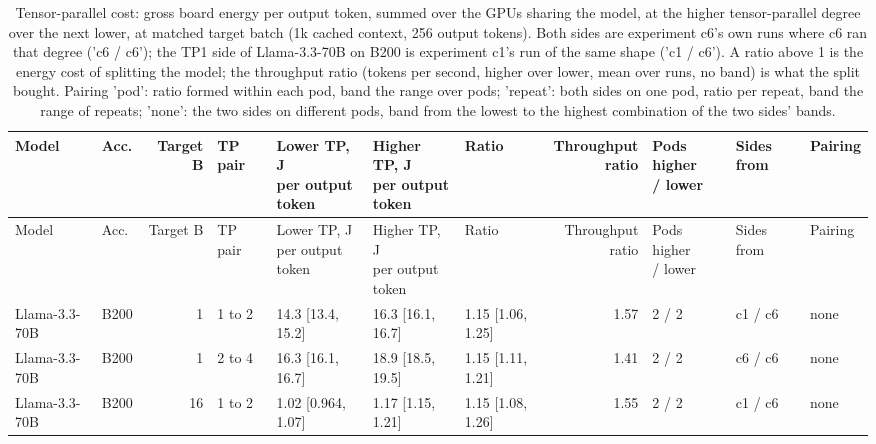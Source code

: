 \begin{landscape}
\begingroup
\scriptsize
\setlength{\tabcolsep}{3pt}
\begin{longtable}{llrllllrlll}
\caption{Tensor-parallel cost: gross board energy per output token, summed over the GPUs sharing the model, at the higher tensor-parallel degree over the next lower, at matched target batch (1k cached context, 256 output tokens). Both sides are experiment c6's own runs where c6 ran that degree ('c6 / c6'); the TP1 side of Llama-3.3-70B on B200 is experiment c1's run of the same shape ('c1 / c6'). A ratio above 1 is the energy cost of splitting the model; the throughput ratio (tokens per second, higher over lower, mean over runs, no band) is what the split bought. Pairing 'pod': ratio formed within each pod, band the range over pods; 'repeat': both sides on one pod, ratio per repeat, band the range of repeats; 'none': the two sides on different pods, band from the lowest to the highest combination of the two sides' bands.}\label{tab:tp}\\
\toprule
Model & Acc. & Target B & TP pair & \makecell[l]{Lower TP, J\\per output\\token} & \makecell[l]{Higher TP, J\\per output\\token} & Ratio & \makecell[r]{Throughput\\ratio} & \makecell[l]{Pods higher\\/ lower} & Sides from & Pairing \\
\midrule
\endfirsthead
\toprule
Model & Acc. & Target B & TP pair & \makecell[l]{Lower TP, J\\per output\\token} & \makecell[l]{Higher TP, J\\per output\\token} & Ratio & \makecell[r]{Throughput\\ratio} & \makecell[l]{Pods higher\\/ lower} & Sides from & Pairing \\
\midrule
\endhead
\bottomrule
\endfoot
Llama-3.3-70B & B200 & 1 & 1 to 2 & 14.3 {[}13.4, 15.2{]} & 16.3 {[}16.1, 16.7{]} & 1.15 {[}1.06, 1.25{]} & 1.57 & 2 / 2 & c1 / c6 & none \\
Llama-3.3-70B & B200 & 1 & 2 to 4 & 16.3 {[}16.1, 16.7{]} & 18.9 {[}18.5, 19.5{]} & 1.15 {[}1.11, 1.21{]} & 1.41 & 2 / 2 & c6 / c6 & none \\
Llama-3.3-70B & B200 & 16 & 1 to 2 & 1.02 {[}0.964, 1.07{]} & 1.17 {[}1.15, 1.21{]} & 1.15 {[}1.08, 1.26{]} & 1.55 & 2 / 2 & c1 / c6 & none \\

\end{longtable}
\end{landscape}
